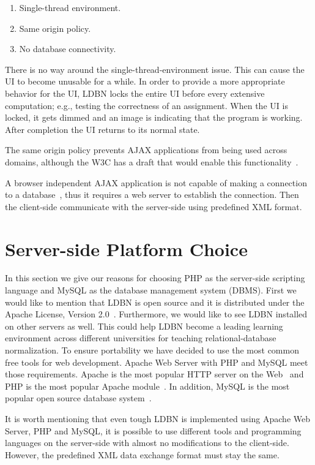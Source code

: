 \begin{enumerate}
	\item Single-thread environment.
	\item Same origin policy.
	\item No database connectivity.
\end{enumerate}

There is no way around the single-thread-environment issue. This can cause the UI
to become unusable for a while. In order to provide a more appropriate behavior 
for the UI, LDBN locks the entire UI before every extensive computation; e.g.,
testing the correctness of an assignment. When the UI is locked,
it gets dimmed and an image is indicating that the program is working. After 
completion the UI returns to its normal state. 

The same origin policy prevents AJAX applications from being used across domains,
although the W3C has a draft that would enable this functionality~\cite{bajax1}.

A browser independent AJAX application is not capable of making a connection 
to a database~\cite{bajax1}, thus it requires a web server to establish the 
connection. Then the client-side communicate with the server-side using 
predefined XML format.

\section{Server-side Platform Choice}
In this section we give our reasons for choosing PHP as the server-side
scripting language and MySQL as the database management system (DBMS). First we would
like to mention that LDBN is open source and it is distributed under the 
Apache License, Version 2.0~\cite{walv2}. Furthermore, we would like to see 
LDBN installed on other servers as well. This could help LDBN become
a leading learning environment across 
different universities for teaching relational-database normalization. To ensure 
portability we have decided to use the most common free 
tools for web development. Apache Web Server with PHP and MySQL meet those requirements. 
Apache is the most popular HTTP server on the Web~\cite{w3} and PHP is the most popular 
Apache module~\cite{w4}. In addition, MySQL is the most popular open source 
database system~\cite{w5}.
 
It is worth mentioning that even tough LDBN is implemented using Apache Web Server,
PHP and MySQL, it is possible to use different tools and programming languages 
on the server-side with almost no modifications to the client-side. However, 
the predefined XML data exchange format must stay the same.

